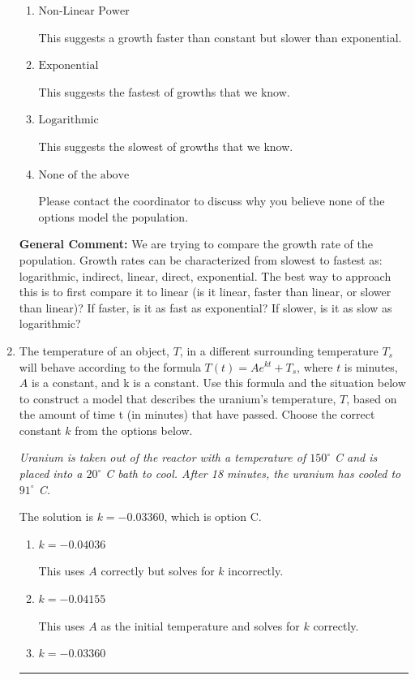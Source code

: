 \documentclass{extbook}[14pt]
\newcommand{\litem}[1]{\item #1

\rule{\textwidth}{0.4pt}}
\begin{document}
\begin{enumerate}
{\begin{enumerate}[label=\Alph*.]
This suggests a constant growth. You would be able to add or subtract the same amount year-to-year if this is the correct answer.
\item \( \text{Non-Linear Power} \)

This suggests a growth faster than constant but slower than exponential.
\item \( \text{Exponential} \)

This suggests the fastest of growths that we know.
\item \( \text{Logarithmic} \)

This suggests the slowest of growths that we know.
\item \( \text{None of the above} \)

Please contact the coordinator to discuss why you believe none of the options model the population.
\end{enumerate}

\textbf{General Comment:} We are trying to compare the growth rate of the population. Growth rates can be characterized from slowest to fastest as: logarithmic, indirect, linear, direct, exponential. The best way to approach this is to first compare it to linear (is it linear, faster than linear, or slower than linear)? If faster, is it as fast as exponential? If slower, is it as slow as logarithmic?
}
\litem{
The temperature of an object, $T$, in a different surrounding temperature $T_s$ will behave according to the formula $T(t) = Ae^{kt} + T_s$, where $t$ is minutes, $A$ is a constant, and k is a constant. Use this formula and the situation below to construct a model that describes the uranium's temperature, $T$, based on the amount of time t (in minutes) that have passed. Choose the correct constant $k$ from the options below.

\begin{center}
    \textit{ Uranium is taken out of the reactor with a temperature of $150^{\circ}$ C and is placed into a $20^{\circ}$ C bath to cool. After 18 minutes, the uranium has cooled to $91^{\circ}$ C. }
\end{center}
The solution is \( k = -0.03360 \), which is option C.\begin{enumerate}[label=\Alph*.]
\item \( k = -0.04036 \)

This uses $A$ correctly but solves for $k$ incorrectly.
\item \( k = -0.04155 \)

This uses $A$ as the initial temperature and solves for $k$ correctly.
\item \( k = -0.03360 \)


\end{enumerate}}
\end{enumerate}
\end{document}
